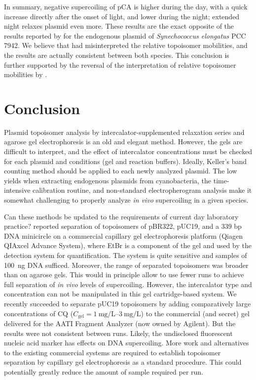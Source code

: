 \documentclass[10pt,a4]{article}
\newcommand{\cqgel}{\ensuremath{C_{\text{gel}}}}
\begin{document}
In summary, negative supercoiling of pCA is higher during the day,
with a quick increase directly after the onset of light, and lower
during the night; extended night relaxes plasmid even more. These
results are the exact opposite of the results reported by
\citet{Woelfle2007} for the endogenous plasmid of
\textit{Synechococcus elongatus} PCC 7942.  We believe that
\citet{Woelfle2007} had misinterpreted the relative topoisomer
mobilities, and the results are actually consistent between both
species. This conclusion is further supported by the reversal of the
interpretation of relative topoisomer mobilities by
\citet{Vijayan2009}.
  

\section{Conclusion}

Plasmid topoisomer analysis by intercalator-supplemented relaxation
series and agarose gel electrophoresis is an old and elegant method.
However, the gels are difficult to interpret, and the effect of
intercalator concentrations must be checked for each plasmid and
conditions (gel and reaction buffers). Ideally, Keller's band counting
method should be applied to each newly analyzed plasmid. The low
yields when extracting endogenous plasmids from cyanobacteria, the
time-intensive calibration routine, and non-standard electropherogram
analysis make it somewhat challenging to properly analyze \textit{in
  vivo} supercoiling in a given species.

Can these methods be updated to the requirements of current day
laboratory practice?  \citet{Mitchenall2018} reported separation of
topoisomers of pBR322, pUC19, and a 339 bp DNA minicircle on a
commercial capillary gel electrophoresis platform (Qiagen QIAxcel
Advance System), where EtBr is a component of the gel and used by the
detection system for quantification. The system is quite sensitive and
samples of \SI{100}{\ng} DNA sufficed. Moreover, the range of
separated topoisomers was broader than on agarose gels. This would in
principle allow to use fewer runs to achieve full separation of
\textit{in vivo} levels of supercoiling.  However, the intercalator
type and concentration can not be manipulated in this gel
cartridge-based system. We recently succeeded to separate pUC19
topoisomers by adding comparatively large concentrations of CQ
($\cqgel=\SIrange{1}{3}{\milli\gram\per\liter}$) to the commercial
(and secret) gel delivered for the AATI Fragment Analyzer (now owned
by Agilent). But the results were not consistent between runs. Likely,
the undisclosed fluorescent nucleic acid marker has effects on DNA
supercoiling. More work and alternatives to the existing commercial
systems are required to establish topoisomer separation by capillary
gel electrophoresis as a standard procedure. This could potentially
greatly reduce the amount of sample required per run.
\end{document}
